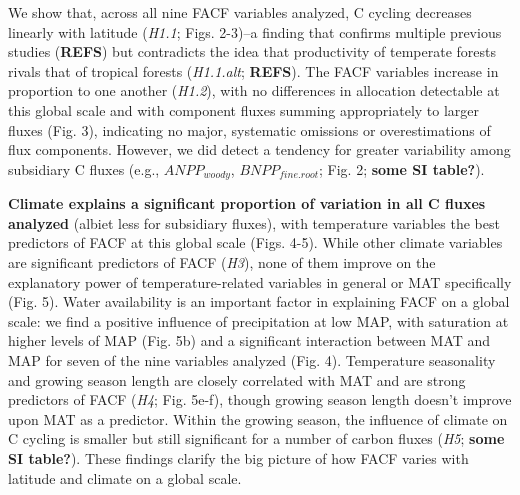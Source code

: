 \documentclass[]{article}
\begin{document}
We show that, across all nine FACF variables analyzed, C cycling
decreases linearly with latitude (\emph{H1.1}; Figs. 2-3)--a finding
that confirms multiple previous studies (\textbf{REFS}) but contradicts
the idea that productivity of temperate forests rivals that of tropical
forests (\emph{H1.1.alt}; \textbf{REFS}). The FACF variables increase in
proportion to one another (\emph{H1.2}), with no differences in
allocation detectable at this global scale and with component fluxes
summing appropriately to larger fluxes (Fig. 3), indicating no major,
systematic omissions or overestimations of flux components. However, we
did detect a tendency for greater variability among subsidiary C fluxes
(e.g., \emph{\(ANPP_{woody}\)}, \emph{\(BNPP_{fine.root}\)}; Fig. 2;
\textbf{some SI table?}).

\textbf{Climate explains a significant proportion of variation in all C
fluxes analyzed} (albiet less for subsidiary fluxes), with temperature
variables the best predictors of FACF at this global scale (Figs. 4-5).
While other climate variables are significant predictors of FACF
(\emph{H3}), none of them improve on the explanatory power of
temperature-related variables in general or MAT specifically (Fig. 5).
Water availability is an important factor in explaining FACF on a global
scale: we find a positive influence of precipitation at low MAP, with
saturation at higher levels of MAP (Fig. 5b) and a significant
interaction between MAT and MAP for seven of the nine variables analyzed
(Fig. 4). Temperature seasonality and growing season length are closely
correlated with MAT and are strong predictors of FACF (\emph{H4}; Fig.
5e-f), though growing season length doesn't improve upon MAT as a
predictor. Within the growing season, the influence of climate on C
cycling is smaller but still significant for a number of carbon fluxes
(\emph{H5}; \textbf{some SI table?}). These findings clarify the big
picture of how FACF varies with latitude and climate on a global scale.
\end{document}
